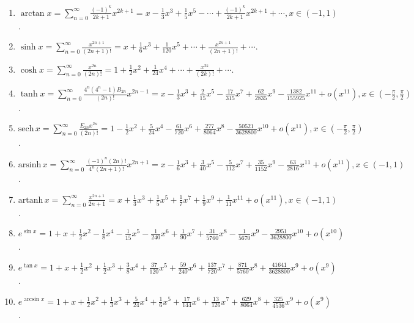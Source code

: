 \documentclass[../../main.tex]{subfiles}
\begin{document}
\begin{enumerate}
\\
\item $\arctan x=\sum_{n=0}^{\infty}\frac{(-1)^k}{2k+1}x^{2k+1}=x-\frac{1}{3}x^3+\frac{1}{5}x^5-\cdots+\frac{(-1)^k}{2k+1}x^{2k+1}+\cdots,x\in(-1,1)$.
\\
\item $\sinh x=\sum_{n=0}^{\infty}\frac{x^{2n+1}}{(2n+1)!}=x+\frac{1}{6}x^3+\frac{1}{120}x^5+\cdots+\frac{x^{2n+1}}{(2n+1)!}+\cdots$.
\\
\item $\cosh x=\sum_{n=0}^{\infty}\frac{x^{2n}}{(2n)!}=1+\frac{1}{2}x^2+\frac{1}{24}x^4+\cdots+\frac{x^{2k}}{(2k)!}+\cdots$.
\\
\item $\tanh x=\sum_{n=0}^{\infty}\frac{4^n(4^n-1)B_{2n}}{(2n)!}x^{2n-1}=x-\frac{1}{3}x^3+\frac{2}{15}x^5-\frac{17}{315}x^7+\frac{62}{2835}x^9-\frac{1382}{155925}x^{11}+o(x^{11}),x\in\left(-\frac{\pi}{2},\frac{\pi}{2}\right)$.
\\
\item $\text{sech}\,x=\sum_{n=0}^{\infty}\frac{E_{2n}x^{2n}}{(2n)!}=1-\frac{1}{2}x^2+\frac{5}{24}x^4-\frac{61}{720}x^6+\frac{277}{8064}x^8-\frac{50521}{3628800}x^{10}+o(x^{11}),x\in\left(-\frac{\pi}{2},\frac{\pi}{2}\right)$.
\\
\item $\text{arsinh}\,x=\sum_{n=0}^{\infty}\frac{(-1)^n(2n)!}{4^n(2n+1)!}x^{2n+1}=x-\frac{1}{6}x^3+\frac{3}{40}x^5-\frac{5}{112}x^7+\frac{35}{1152}x^9-\frac{63}{2816}x^{11}+o(x^{11}),x\in(-1,1)$.
\\
\item $\text{artanh}\,x=\sum_{n=0}^{\infty}\frac{x^{2n+1}}{2n+1}=x+\frac{1}{3}x^3+\frac{1}{5}x^5+\frac{1}{7}x^7+\frac{1}{9}x^9+\frac{1}{11}x^{11}+o(x^{11}),x\in(-1,1)$.
\\
\item $e^{\sin x}=1+x+\frac{1}{2}x^2-\frac{1}{8}x^4-\frac{1}{15}x^5-\frac{1}{240}x^6+\frac{1}{90}x^7+\frac{31}{5760}x^8-\frac{1}{5670}x^9-\frac{2951}{3628800}x^{10}+o(x^{10})$.
\\
\item $e^{\tan x}=1+x+\frac{1}{2}x^2+\frac{1}{2}x^3+\frac{3}{8}x^4+\frac{37}{120}x^5+\frac{59}{240}x^6+\frac{137}{720}x^7+\frac{871}{5760}x^8+\frac{41641}{3628800}x^9+o(x^9)$.
\\
\item $e^{\arcsin x}=1+x+\frac{1}{2}x^2+\frac{1}{3}x^3+\frac{5}{24}x^4+\frac{1}{6}x^5+\frac{17}{144}x^6+\frac{13}{126}x^7+\frac{629}{8064}x^8+\frac{325}{4536}x^9+o(x^9)$.
\\

\end{enumerate}
\end{document}
